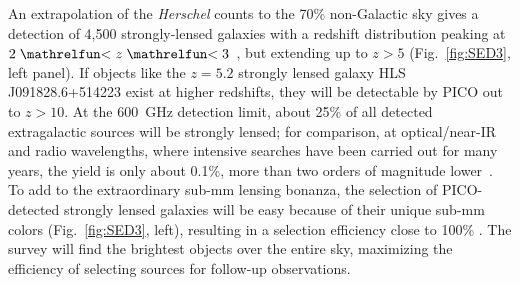 \documentclass[PICOReport.tex]{subfiles}
\begin{document}
An extrapolation of the \textit{Herschel} counts to the 70\% non-Galactic sky gives a detection of 4,500 strongly-lensed galaxies with a redshift distribution peaking at $2\simlt z \simlt 3$~\cite{Negrello2017lensed}, but extending up to $z> 5$ (Fig.~\ref{fig:SED3}, left panel).
If objects like the $z=5.2$ strongly lensed galaxy HLS\,J091828.6+514223 exist at higher redshifts, they will be detectable by PICO out to $z>10$. At the 600~GHz detection limit, about 25\% of all detected extragalactic sources will be strongly lensed; for comparison, at optical/near-IR and radio wavelengths, where intensive searches have been carried out for many years, the yield is only about 0.1\%, more than two orders of magnitude lower~\cite{Treu2010}. To add to the extraordinary sub-mm lensing bonanza, the selection of PICO-detected strongly lensed galaxies will be easy because of their unique sub-mm colors (Fig.~\ref{fig:SED3}, left), resulting in a selection efficiency close to 100\% \citep{Negrello2010}. The survey will find the brightest objects over the entire sky, maximizing the efficiency of selecting sources for follow-up observations. 
\end{document}
